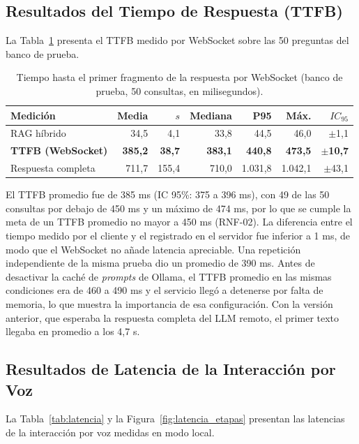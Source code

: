 \subsection{Resultados del Tiempo de Respuesta (TTFB)}
La Tabla~\ref{tab:ttfb} presenta el TTFB medido por WebSocket sobre las 50 preguntas del banco de prueba.

\begin{table}[H]
  \caption{Tiempo hasta el primer fragmento de la respuesta por WebSocket (banco de prueba, 50 consultas, en milisegundos).}
  \label{tab:ttfb}
  \centering
  \small
  \setlength{\tabcolsep}{3.5pt}
  \renewcommand{\arraystretch}{1.2}
  \begin{tabular}{|l|r|r|r|r|r|r|}
    \hline
    \rowcolor[HTML]{EFEFEF}
    \textbf{Medición} & \textbf{Media} & \textbf{$s$} & \textbf{Mediana} & \textbf{P95} & \textbf{Máx.} & \textbf{$IC_{95}$} \\ \hline
    RAG híbrido & 34,5 & 4,1 & 33,8 & 44,5 & 46,0 & $\pm$1,1 \\ \hline
    \textbf{TTFB (WebSocket)} & \textbf{385,2} & \textbf{38,7} & \textbf{383,1} & \textbf{440,8} & \textbf{473,5} & \textbf{$\pm$10,7} \\ \hline
    Respuesta completa & 711,7 & 155,4 & 710,0 & 1.031,8 & 1.042,1 & $\pm$43,1 \\ \hline
  \end{tabular}
  \elaboradopor{\autorTFG}
\end{table}

El TTFB promedio fue de 385 ms (IC 95\%: 375 a 396 ms), con 49 de las 50 consultas por debajo de 450 ms y un máximo de 474 ms, por lo que se cumple la meta de un TTFB promedio no mayor a 450 ms (RNF-02). La diferencia entre el tiempo medido por el cliente y el registrado en el servidor fue inferior a 1 ms, de modo que el WebSocket no añade latencia apreciable. Una repetición independiente de la misma prueba dio un promedio de 390 ms. Antes de desactivar la caché de \textit{prompts} de Ollama, el TTFB promedio en las mismas condiciones era de 460 a 490 ms y el servicio llegó a detenerse por falta de memoria, lo que muestra la importancia de esa configuración. Con la versión anterior, que esperaba la respuesta completa del LLM remoto, el primer texto llegaba en promedio a los 4,7 s.

\subsection{Resultados de Latencia de la Interacción por Voz}
La Tabla~\ref{tab:latencia} y la Figura~\ref{fig:latencia_etapas} presentan las latencias de la interacción por voz medidas en modo local.

